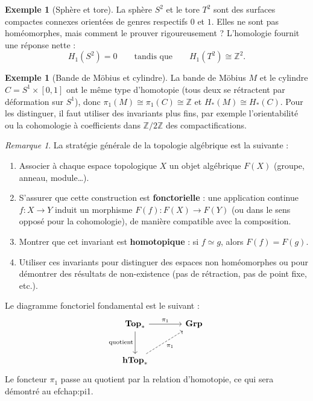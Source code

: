 \documentclass[12pt,a4paper,openany]{book}
\theoremstyle{definition}
\newtheorem{exemple}[definition]{Exemple}
\theoremstyle{plain}
\theoremstyle{remark}
\newtheorem{remarque}[definition]{Remarque}
\newcommand{\Z}{\mathbb{Z}}
\begin{document}
\begin{exemple}[Sphère et tore]\label{ex:motivation-S2-T2}
La sphère $S^2$ et le tore $T^2$ sont des surfaces compactes connexes orientées
de genres respectifs $0$ et $1$. Elles ne sont pas homéomorphes, mais comment le
prouver rigoureusement ? L'homologie fournit une réponse nette :
\[
H_1(S^2) = 0 \qquad \text{tandis que} \qquad H_1(T^2) \cong \Z^2.
\]
\end{exemple}

\begin{exemple}[Bande de Möbius et cylindre]\label{ex:motivation-mobius}
La bande de Möbius $M$ et le cylindre $C = S^1 \times [0,1]$ ont le même type
d'homotopie (tous deux se rétractent par déformation sur $S^1$), donc
$\pi_1(M) \cong \pi_1(C) \cong \Z$ et $H_*(M) \cong H_*(C)$. Pour les
distinguer, il faut utiliser des invariants plus fins, par exemple l'orientabilité
ou la cohomologie à coefficients dans $\Z/2\Z$ des compactifications.
\end{exemple}

\begin{remarque}\label{rem:strategie-invariants}
La stratégie générale de la topologie algébrique est la suivante :
\begin{enumerate}[label=(\arabic*)]
\item Associer à chaque espace topologique $X$ un objet algébrique $F(X)$
(groupe, anneau, module\ldots).
\item S'assurer que cette construction est \textbf{fonctorielle} : une application
continue $f : X \to Y$ induit un morphisme $F(f) : F(X) \to F(Y)$ (ou dans le
sens opposé pour la cohomologie), de manière compatible avec la composition.
\item Montrer que cet invariant est \textbf{homotopique} : si $f \simeq g$, alors
$F(f) = F(g)$.
\item Utiliser ces invariants pour distinguer des espaces non homéomorphes ou pour
démontrer des résultats de non-existence (pas de rétraction, pas de point fixe,
etc.).
\end{enumerate}
\end{remarque}

Le diagramme fonctoriel fondamental est le suivant :
\[
\begin{tikzcd}[column sep=large, row sep=large]
\mathbf{Top}_* \arrow[r, "\pi_1"] \arrow[d, "\text{quotient}"'] & \mathbf{Grp} \\
\mathbf{hTop}_* \arrow[ru, "\pi_1"', dashed] &
\end{tikzcd}
\]
Le foncteur $\pi_1$ passe au quotient par la relation d'homotopie, ce qui sera
démontré au 
ef{chap:pi1}.
\end{document}
